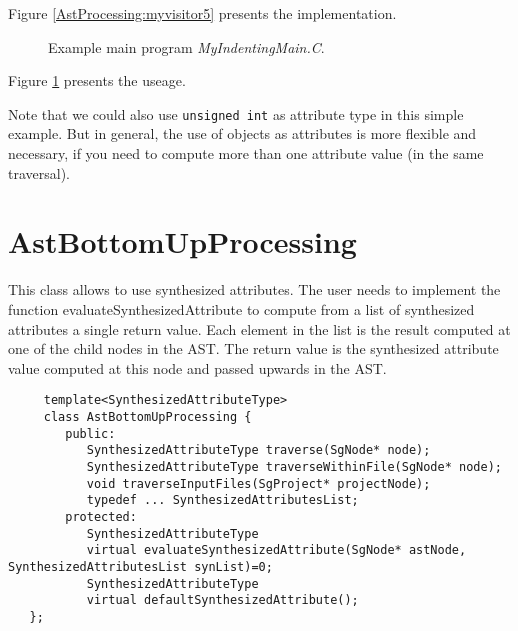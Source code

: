 Figure \ref{AstProcessing:myvisitor5} presents the implementation.

\begin{figure}
\begin{latexonly}
   
\end{latexonly}

\begin{htmlonly}
   
\end{htmlonly}
\caption{Example main program {\em MyIndentingMain.C}.}
\label{AstProcessing:myvisitor6}
\end{figure}

Figure \ref{AstProcessing:myvisitor6} presents the useage.


Note that we could also use {\tt unsigned int} as attribute type in this 
simple example. But in general, the use of objects as attributes is more 
flexible and necessary, if you need to compute more than one attribute 
value (in the same traversal).

\section{AstBottomUpProcessing}
\label{AstProcessing:AstBottomUpProcessing}

This class allows to use synthesized attributes. The user needs to
implement the function evaluateSynthesizedAttribute to compute from a
list of synthesized attributes a single return value. Each element in the list is the
result computed at one of the child nodes in the AST. The return value is the synthesized
attribute value computed at this node and passed upwards in the AST.

{\indent
{\mySmallFontSize
\begin{verbatim}
     template<SynthesizedAttributeType>
     class AstBottomUpProcessing {
        public:
           SynthesizedAttributeType traverse(SgNode* node);
           SynthesizedAttributeType traverseWithinFile(SgNode* node);
           void traverseInputFiles(SgProject* projectNode);
           typedef ... SynthesizedAttributesList;
        protected:
           SynthesizedAttributeType
           virtual evaluateSynthesizedAttribute(SgNode* astNode, SynthesizedAttributesList synList)=0;
           SynthesizedAttributeType
           virtual defaultSynthesizedAttribute();
   };
\end{verbatim}
}}

